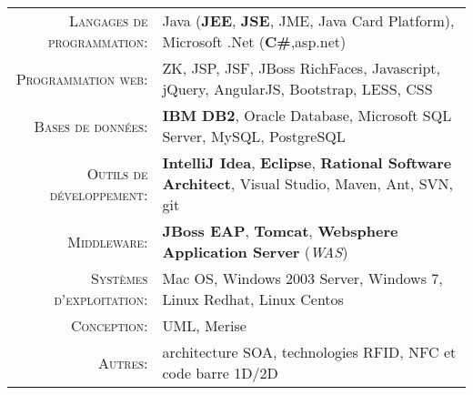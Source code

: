 \renewcommand{\arraystretch}{1.1}

	\begin{tabular}{>{\small}r>{\small}p{13cm}} 
		\textsc{Langages de programmation:}  &   Java (\textbf{JEE}, \textbf{JSE}, JME, Java Card Platform), Microsoft .Net (\textbf{C\#},asp.net)\\ 
		\textsc{Programmation web:}               &   ZK, JSP, JSF, JBoss RichFaces, Javascript, jQuery, AngularJS, Bootstrap, LESS, CSS\\ 
		\textsc{Bases de données:}                  &   \textbf{IBM DB2}, Oracle Database, Microsoft SQL Server, MySQL, PostgreSQL \\ 
		\textsc{Outils de développement:}	  &   \textbf {IntelliJ Idea}, \textbf {Eclipse}, \textbf{Rational Software Architect}, Visual Studio, Maven, Ant, SVN, git\\
		\textsc{Middleware:}				        &   \textbf{JBoss EAP}, \textbf{Tomcat}, \textbf{Websphere Application Server} (\emph{WAS})\\ 
		\textsc{Systèmes d'exploitation:}	        &   Mac OS, Windows 2003 Server, Windows 7, Linux Redhat, Linux Centos\\ 
		\textsc{Conception:}				        &   UML, Merise\\
		\textsc{Autres:}					        &   architecture SOA, technologies RFID, NFC et code barre 1D/2D
	\end{tabular}